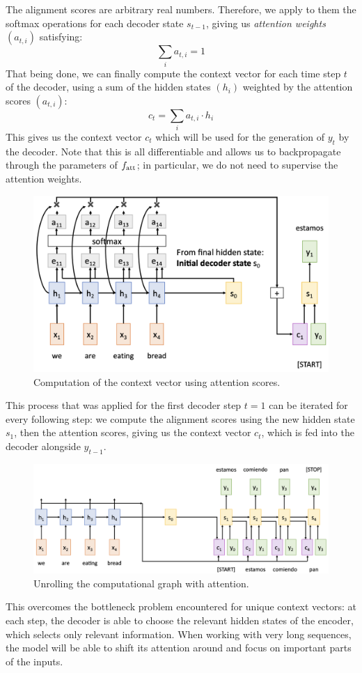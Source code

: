 The alignment scores are arbitrary real numbers. Therefore, we apply to them the softmax operations for each decoder state $s_{t-1}$, giving us \emph{attention weights} $(a_{t,i})$ satisfying:
\begin{equation*}
    \sum_i a_{t,i} = 1 
\end{equation*}
That being done, we can finally compute the context vector for each time step $t$ of the decoder, using a sum of the hidden states $(h_i)$ weighted by the attention scores $(a_{t,i})$:
\begin{equation*}
    c_t = \sum_i a_{t,i}\cdot h_i
\end{equation*}
This gives us the context vector $c_t$ which will be used for the generation of $y_t$ by the decoder. Note that this is all differentiable and allows us to backpropagate through the parameters of $f_{\textnormal{att}}$; in particular, we do not need to supervise the attention weights.
\begin{figure}[H]
    \centering
    \includegraphics[width=.65\textwidth]{images/attention-context.png}
    \caption{Computation of the context vector using attention scores.}
\end{figure}
This process that was applied for the first decoder step $t=1$ can be iterated for every following step: we compute the alignment scores using the new hidden state $s_1$, then the attention scores, giving us the context vector $c_t$, which is fed into the decoder alongside $y_{t-1}$.
\begin{figure}[H]
    \centering
    \includegraphics[width=.9\textwidth]{images/attention-unrolled.png}
    \caption{Unrolling the computational graph with attention.}
\end{figure}
This overcomes the bottleneck problem encountered for unique context vectors: at each step, the decoder is able to choose the relevant hidden states of the encoder, which selects only relevant information. When working with very long sequences, the model will be able to shift its attention around and focus on important parts of the inputs.

\newpage